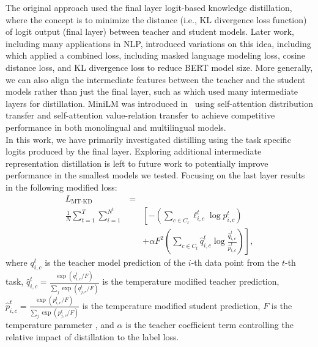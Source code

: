\documentclass[letterpaper]{article} %
\begin{document}
The original approach used the final layer logit-based knowledge distillation, where the concept is to minimize the distance (i.e., KL divergence loss function) of logit output (final layer) between teacher and student models. 
Later work, including many applications in NLP, introduced variations on this idea, including \cite{sanh2019distilbert} which applied a combined loss, including masked language modeling loss, cosine distance loss, and KL divergence loss to reduce BERT model size.
More generally, we can also align the intermediate features between the teacher and the student models rather than just the final layer, such as \cite{jiao2020tinybert} which used many intermediate layers for distillation.
MiniLM was introduced in~\cite{wang2020minilm} using self-attention distribution transfer and self-attention value-relation transfer to achieve competitive performance in both monolingual and multilingual models. \\

In this work, we have primarily investigated distilling using the task specific logits produced by the final layer.
Exploring additional intermediate representation distillation is left to future work to potentially improve performance in the smallest models we tested.
Focusing on the last layer results in the following modified loss:
\begin{eqnarray}
L_{\mbox{MT-KD}} &=& \nonumber \\
 \frac{1}{N} \sum_{t=1}^T \sum_{i=1}^{N^t} &&\left[ - \left( \sum_{c \in C_{t}} \ell_{i,c}^t \log p_{i,c}^t \right) \right. \nonumber \\
&& \left. + \alpha F^2 \left( \sum_{c \in C_{t}} \hat{q}_{i,c}^t \log \frac{\hat{q}_{i,c}^t}{\hat{p}_{i,c}^t} \right)  \right],
\end{eqnarray}
where $q_{i,c}^t$ is the teacher model prediction of the $i$-th data point from the $t$-th task, $\hat{q}_{i,c}^t = \frac{\exp(q_{i,c}^t/F)}{ \sum_j \exp(q_{j,c}^t/F)}$ is the temperature modified teacher prediction, $\hat{p}_{i,c}^t = \frac{\exp(p_{i,c}^t/F)}{ \sum_j \exp(p_{j,c}^t/F)}$ is the temperature modified student prediction, $F$ is the temperature parameter \cite{hinton2015distilling}, and $\alpha$ is the teacher coefficient term controlling the relative impact of distillation to the label loss.
\end{document}
